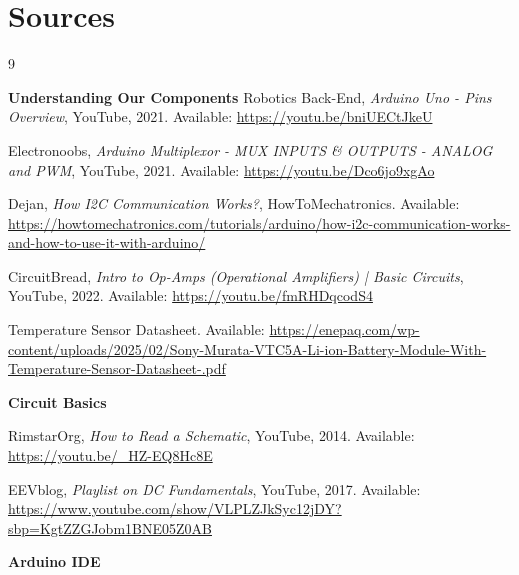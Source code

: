 \documentclass{article}
\begin{document}
\section{Sources} 
\begin{thebibliography}{9}

    \bibitem[]{}\textbf{\large Understanding Our Components}\medskip 
     Robotics Back-End, \textit{Arduino Uno - Pins Overview}, YouTube, 2021. Available: \url{https://youtu.be/bniUECtJkeU}

     Electronoobs, \textit{Arduino Multiplexor - MUX INPUTS \& OUTPUTS - ANALOG and PWM}, YouTube, 2021. Available: \url{https://youtu.be/Dco6jo9xgAo}

     Dejan, \textit{How I2C Communication Works?}, HowToMechatronics. Available: \url{https://howtomechatronics.com/tutorials/arduino/how-i2c-communication-works-and-how-to-use-it-with-arduino/}
    
     CircuitBread, \textit{Intro to Op-Amps (Operational Amplifiers) | Basic Circuits}, YouTube, 2022. Available: \url{https://youtu.be/fmRHDqcodS4}

     Temperature Sensor Datasheet. Available: \url{https://enepaq.com/wp-content/uploads/2025/02/Sony-Murata-VTC5A-Li-ion-Battery-Module-With-Temperature-Sensor-Datasheet-.pdf}

    \bibitem[]{}\medskip\medskip\textbf{\large Circuit Basics}\medskip

     RimstarOrg, \textit{How to Read a Schematic}, YouTube, 2014. Available: \url{https://youtu.be/_HZ-EQ8Hc8E}

     EEVblog, \textit{Playlist on DC Fundamentals}, YouTube, 2017. Available: \url{https://www.youtube.com/show/VLPLZJkSyc12jDY?sbp=KgtZZGJobm1BNE05Z0AB}

    \bibitem[]{}\medskip\medskip\textbf{\large Arduino IDE}\medskip

\end{thebibliography}
\end{document}

